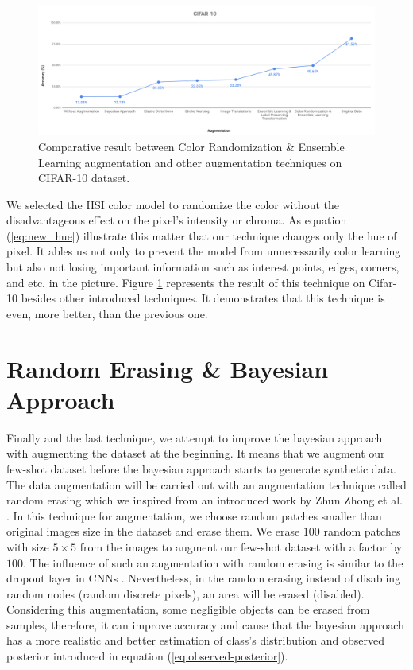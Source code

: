 \begin{figure}
  \centering
  \label{fig:cifar_10_random_color_result}
  \includegraphics[width=1\textwidth]{fig/contribution/cifar-10-random-color-result}
  \caption{Comparative result between Color Randomization \& Ensemble Learning augmentation and other augmentation techniques on CIFAR-10 dataset.}
\end{figure}

We selected the HSI color model to randomize the color without the disadvantageous effect on the
pixel's intensity or chroma. As equation (\ref{eq:new_hue}) illustrate this matter that our
technique changes only the hue of pixel. It ables us not only to prevent the model from
unnecessarily color learning but also not losing important information such as interest points,
edges, corners, and etc. in the picture. Figure \ref{fig:cifar_10_random_color_result} represents the result
of this technique on Cifar-10 besides other introduced techniques. It demonstrates that this
technique is even, more better, than the previous one.


\section{Random Erasing \& Bayesian Approach}
Finally and the last technique, we attempt to improve the bayesian approach with augmenting the
dataset at the beginning. It means that we augment our few-shot dataset before the bayesian approach
starts to generate synthetic data. The data augmentation will be carried out with an augmentation
technique called random erasing which we inspired from an introduced work by Zhun Zhong et al.
\cite{random_erasing}. In this technique for augmentation, we choose random patches smaller than
original images size in the dataset and erase them. We erase $100$ random patches with size $5
  \times 5$ from the images to augment our few-shot dataset with a factor by $100$. The influence of
such an augmentation with random erasing is similar to the dropout layer in CNNs \cite{dropout_book}.
Nevertheless, in the random erasing instead of disabling random nodes (random discrete pixels), an
area will be erased (disabled). Considering this augmentation, some negligible objects can be erased
from samples, therefore, it can improve accuracy and cause that the bayesian approach has a more
realistic and better estimation of class's distribution and observed posterior introduced in
equation (\ref{eq:observed-posterior}).

